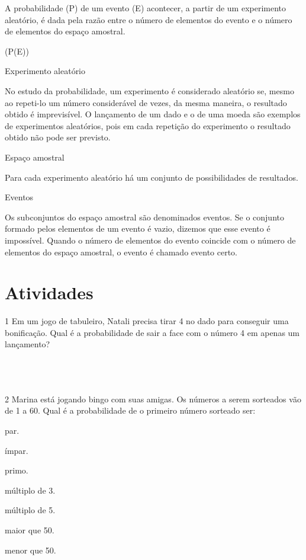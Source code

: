 A probabilidade (P) de um evento (E) acontecer, a partir de um
experimento aleatório, é dada pela razão entre o número de elementos do
evento e o número de elementos do espaço amostral.

(P(E))

Experimento aleatório

No estudo da probabilidade, um experimento é considerado aleatório se,
mesmo ao repeti-lo um número considerável de vezes, da mesma maneira, o
resultado obtido é imprevisível. O lançamento de um dado e o de uma
moeda são exemplos de experimentos aleatórios, pois em cada repetição do
experimento o resultado obtido não pode ser previsto.

Espaço amostral

Para cada experimento aleatório há um conjunto de possibilidades de
resultados.

Eventos

Os subconjuntos do espaço amostral são denominados eventos. Se o
conjunto formado pelos elementos de um evento é vazio, dizemos que esse
evento é impossível. Quando o número de elementos do evento coincide com
o número de elementos do espaço amostral, o evento é chamado evento
certo.

\section{Atividades}

\num{1} Em um jogo de tabuleiro, Natali precisa tirar 4 no dado para
conseguir uma bonificação. Qual é a probabilidade de sair a face com o
número 4 em apenas um lançamento?

\\
\\
\\

\num{2} Marina está jogando bingo com suas amigas. Os números a serem
sorteados vão de 1 a 60. Qual é a probabilidade de o primeiro número 
sorteado ser:
\item par.
\item ímpar.
\item primo.
\item múltiplo de 3.
\item múltiplo de 5.
\item maior que 50.
\item menor que 50.

